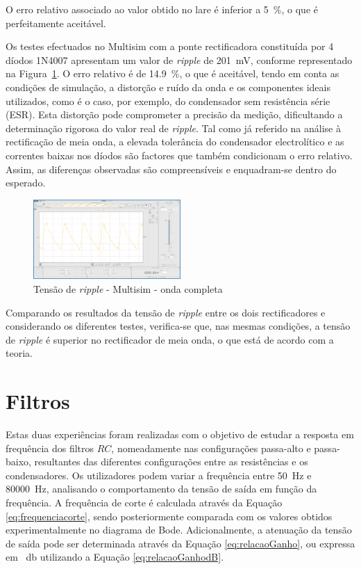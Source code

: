 O erro relativo associado ao valor obtido no \acrshort{lare} é inferior a \SI{5}{\percent}, o que é perfeitamente aceitável.

Os testes efectuados no Multisim com a ponte rectificadora constituída por 4 díodos 1N4007 apresentam um valor de \textit{ripple} de \SI{201}{\milli\volt}, conforme representado na Figura~\ref{fig:ripplemultisim}. O erro relativo é de \SI{14,9}{\percent}, o que é aceitável, tendo em conta as condições de simulação, a distorção e ruído da onda e os componentes ideais utilizados, como é o caso, por exemplo, do condensador sem resistência série (ESR). Esta distorção pode comprometer a precisão da medição, dificultando a determinação rigorosa do valor real de \textit{ripple}. Tal como já referido na análise à rectificação de meia onda, a elevada tolerância do condensador electrolítico e as correntes baixas nos díodos são factores que também condicionam o erro relativo. Assim, as diferenças observadas são compreensíveis e enquadram-se dentro do esperado.

\begin{figure}[hbtp]
	\centering
	\includegraphics[width=0.5\textwidth]{figures/OC_RIPPLE_VB_1N4007.png}
	\caption{Tensão de \textit{ripple} - Multisim - onda completa}
	\label{fig:ripplemultisim}
\end{figure}

Comparando os resultados da tensão de \textit{ripple} entre os dois rectificadores e considerando os diferentes testes, verifica-se que, nas mesmas condições, a tensão de \textit{ripple} é superior no rectificador de meia onda, o que está de acordo com a teoria.


\section{Filtros}
\label{sec:resultados_filtros}
Estas duas experiências foram realizadas com o objetivo de estudar a resposta em frequência dos filtros $RC$, nomeadamente nas configurações passa-alto e passa-baixo, resultantes das diferentes configurações entre as resistências e os condensadores. Os utilizadores podem variar a frequência entre \SI{50}{\hertz} e \SI{80000}{\hertz}, analisando o comportamento da tensão de saída em função da frequência. A frequência de corte é calculada através da Equação \ref{eq:frequenciacorte}, sendo posteriormente comparada com os valores obtidos experimentalmente no diagrama de Bode. Adicionalmente, a atenuação da tensão de saída pode ser determinada através da Equação \ref{eq:relacaoGanho}, ou expressa em \SI{}{\decibel} utilizando a Equação \ref{eq:relacaoGanhodB}.

